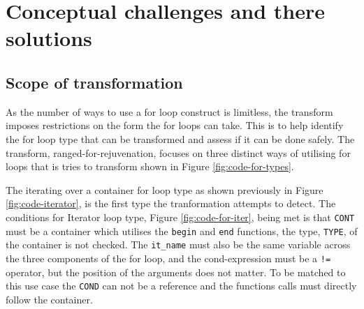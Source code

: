 \documentclass[bsc,frontabs,singlespacing,parskip,deptreport]{infthesis}
\begin{document}


\section{Conceptual challenges and there solutions}\label{sec:for-concept}
\subsection{Scope of transformation}
As the number of ways to use a for loop construct is limitless, the transform imposes restrictions on the form the for loops can take. This is to help identify the for loop type that can be transformed and assess if it can be done safely. The transform, ranged-for-rejuvenation, focuses on three distinct ways of utilising for loops that is tries to transform shown in Figure \ref{fig:code-for-types}. 


The iterating over a container for loop type as shown previously in Figure \ref{fig:code-iterator}, is the first type the tranformation attempts to detect.
The conditions for Iterator loop type, Figure \ref{fig:code-for-iter}, being met is that \texttt{CONT} must be a container which utilises the \texttt{begin} and \texttt{end} functions, the type, \texttt{TYPE}, of the container is not checked. The \texttt{it\_name} must also be the same variable across the three components of the for loop, and the cond-expression must be a \texttt{!=} operator, but the position of the arguments does not matter. To be matched to this use case the \texttt{COND} can not be a reference and the functions calls must directly follow the container. 
\end{document}
